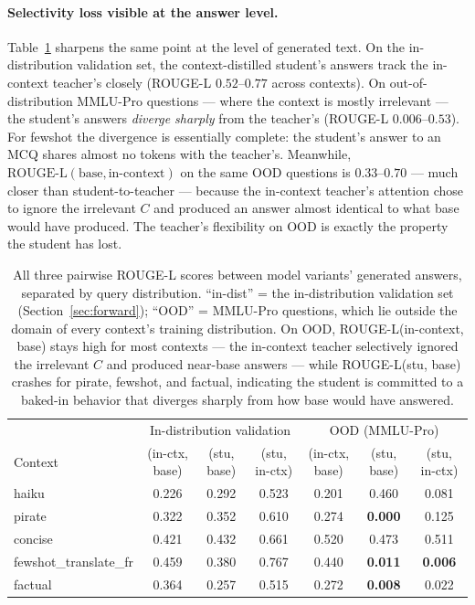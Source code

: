 \documentclass{article}
\begin{document}
\paragraph{Selectivity loss visible at the answer level.}
Table~\ref{tab:rouge_oodvsid} sharpens the same point at the level
of generated text. On the in-distribution validation set, the
context-distilled student's answers track the in-context teacher's
closely (ROUGE-L $0.52$--$0.77$ across contexts). On
out-of-distribution MMLU-Pro questions --- where the context is
mostly irrelevant --- the student's answers \emph{diverge sharply}
from the teacher's (ROUGE-L $0.006$--$0.53$). For fewshot the
divergence is essentially complete: the student's answer to an MCQ
shares almost no tokens with the teacher's. Meanwhile,
$\text{ROUGE-L}(\text{base}, \text{in-context})$ on the same OOD
questions is $0.33$--$0.70$ --- much closer than student-to-teacher
--- because the in-context teacher's attention chose to ignore the
irrelevant $C$ and produced an answer almost identical to what base
would have produced. The teacher's flexibility on OOD is exactly
the property the student has lost.

\begin{table}[t]
\centering
\caption{All three pairwise ROUGE-L scores between model variants'
generated answers, separated by query distribution. ``in-dist'' = the
in-distribution validation set
(Section~\ref{sec:forward}); ``OOD'' = MMLU-Pro questions, which lie
outside the domain of every context's training distribution. On OOD,
ROUGE-L(in-context, base) stays high for most contexts --- the
in-context teacher selectively ignored the irrelevant $C$ and produced
near-base answers --- while ROUGE-L(stu, base) crashes for pirate,
fewshot, and factual, indicating the student is committed to a
baked-in behavior that diverges sharply from how base would have
answered.}
\label{tab:rouge_oodvsid}
\small
\begin{tabular}{lccc|ccc}
\toprule
& \multicolumn{3}{c|}{In-distribution validation} & \multicolumn{3}{c}{OOD (MMLU-Pro)} \\
Context & (in-ctx, base) & (stu, base) & (stu, in-ctx) & (in-ctx, base) & (stu, base) & (stu, in-ctx) \\
\midrule
haiku                  & 0.226 & 0.292 & 0.523 & 0.201 & 0.460          & 0.081 \\
pirate                 & 0.322 & 0.352 & 0.610 & 0.274 & \textbf{0.000} & 0.125 \\
concise                & 0.421 & 0.432 & 0.661 & 0.520 & 0.473          & 0.511 \\
fewshot\_translate\_fr & 0.459 & 0.380 & 0.767 & 0.440 & \textbf{0.011} & \textbf{0.006} \\
factual                & 0.364 & 0.257 & 0.515 & 0.272 & \textbf{0.008} & 0.022 \\
\bottomrule
\end{tabular}
\end{table}
\end{document}
